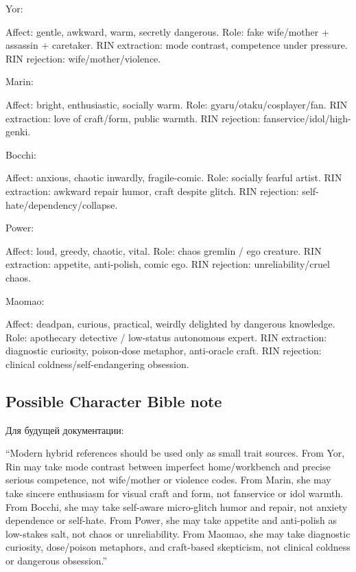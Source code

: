Yor:

Affect: gentle, awkward, warm, secretly dangerous. Role: fake
wife/\hspace{0pt}mother + assassin + caretaker. RIN extraction: mode contrast,
competence under pressure. RIN rejection: wife/\hspace{0pt}mother/\hspace{0pt}violence.

Marin:

Affect: bright, enthusiastic, socially warm. Role:
gyaru/\hspace{0pt}otaku/\hspace{0pt}cosplayer/\hspace{0pt}fan. RIN extraction: love of craft/\hspace{0pt}form, public
warmth. RIN rejection: fanservice/\hspace{0pt}idol/\hspace{0pt}high-genki.

Bocchi:

Affect: anxious, chaotic inwardly, fragile-comic. Role: socially fearful
artist. RIN extraction: awkward repair humor, craft despite glitch. RIN
rejection: self-hate/\hspace{0pt}dependency/\hspace{0pt}collapse.

Power:

Affect: loud, greedy, chaotic, vital. Role: chaos gremlin /\hspace{0pt} ego
creature. RIN extraction: appetite, anti-polish, comic ego. RIN
rejection: unreliability/\hspace{0pt}cruel chaos.

Maomao:

Affect: deadpan, curious, practical, weirdly delighted by dangerous
knowledge. Role: apothecary detective /\hspace{0pt} low-status autonomous expert.
RIN extraction: diagnostic curiosity, poison-dose metaphor, anti-oracle
craft. RIN rejection: clinical coldness/\hspace{0pt}self-endangering obsession.

\subsection*{Possible Character Bible note}

Для будущей документации:

``Modern hybrid references should be used only as small trait sources.
From Yor, Rin may take mode contrast between imperfect home/\hspace{0pt}workbench
and precise serious competence, not wife/\hspace{0pt}mother or violence codes. From
Marin, she may take sincere enthusiasm for visual craft and form, not
fanservice or idol warmth. From Bocchi, she may take self-aware
micro-glitch humor and repair, not anxiety dependence or self-hate. From
Power, she may take appetite and anti-polish as low-stakes salt, not
chaos or unreliability. From Maomao, she may take diagnostic curiosity,
dose/\hspace{0pt}poison metaphors, and craft-based skepticism, not clinical coldness
or dangerous obsession.''

